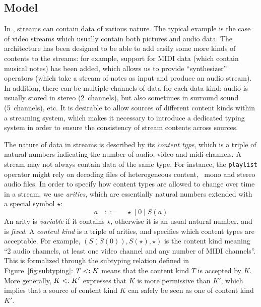 
\subsection{Model}


In \liquidsoap{}, streams can contain data of various nature. The typical
example is the case of video streams which usually contain both pictures and
audio data. The architecture has been designed to be able to add easily some
more kinds of contents to the streams: for example, support for MIDI data (which
contain musical notes) has been added, which allows us to provide
``synthesizer'' operators (which take a stream of notes as input and produce an
audio stream). In addition, there can be multiple channels of data for each data
kind: audio is usually stored in stereo (2~channels), but also sometimes in
surround sound (5~channels), etc. It is desirable to allow sources of different
content kinds within a streaming system, which makes it necessary to introduce a
dedicated typing system in order to ensure the consistency of stream contents
across sources.

The nature of data in streams is described by its \emph{content type}, which is
a triple of natural numbers indicating the number of audio, video and midi
channels.  A stream may not always contain data of the same type.  For instance,
the \texttt{playlist} operator might rely on decoding files of heterogeneous
content, \eg\ mono and stereo audio files.  In order to specify how content
types are allowed to change over time in a stream, we use \emph{arities}, which
are essentially natural numbers extended with a special symbol $\star$:
\[
a\quad ::=\quad \star \;|\; 0 \;|\; S(a)
\]
An arity is \emph{variable} if it contains $\star$, otherwise it is an usual
natural number, and is \emph{fixed}. A \emph{content kind} is a triple of
arities, and specifies which content types are acceptable. For example,
$(S(S(0)),S(\star),\star)$ is the content kind meaning ``2 audio channels, at
least one video channel and any number of MIDI channels''.
This is formalized through the subtyping relation defined in
Figure~\ref{fig:subtyping}: $T<: K$ means
that the content kind $T$ is accepted by $K$. More generally,
$K <: K'$ expresses that $K$ is more permissive than $K'$,
which implies that a source of content kind $K$ can safely be seen
as one of content kind $K'$.

